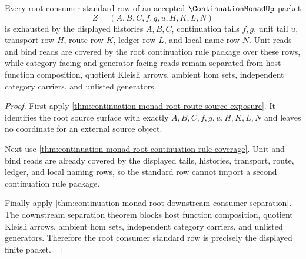 \begin{theorem}
\label{thm:continuation-monad-root-consumer-standard-row}
Every root consumer standard row of an accepted $\ContinuationMonadUp$ packet
$$
Z=(A,B,C,f,g,u,H,K,L,N)
$$
is exhausted by the displayed histories $A,B,C$, continuation tails $f,g$, unit tail $u$, transport row $H$, route row $K$, ledger row $L$, and local name row $N$. Unit reads and bind reads are covered by the root continuation rule package over these rows, while category-facing and generator-facing reads remain separated from host function composition, quotient Kleisli arrows, ambient hom sets, independent category carriers, and unlisted generators.
\end{theorem}
\begin{proof}
First apply \autoref{thm:continuation-monad-root-route-source-exposure}. It identifies the root source surface with exactly $A,B,C,f,g,u,H,K,L,N$ and leaves no coordinate for an external source object.

Next use \autoref{thm:continuation-monad-root-continuation-rule-coverage}. Unit and bind reads are already covered by the displayed tails, histories, transport, route, ledger, and local naming rows, so the standard row cannot import a second continuation rule package.

Finally apply \autoref{thm:continuation-monad-root-downstream-consumer-separation}. The downstream separation theorem blocks host function composition, quotient Kleisli arrows, ambient hom sets, independent category carriers, and unlisted generators. Therefore the root consumer standard row is precisely the displayed finite packet.
\end{proof}
